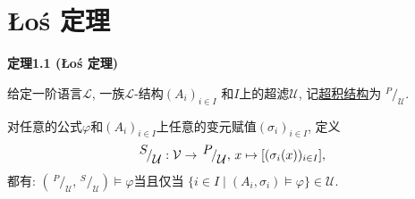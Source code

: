 \documentclass[UTF8]{ctexart}
\begin{document}
\setlength{\abovedisplayskip}{1pt}
\setlength{\belowdisplayskip}{1pt}

\section{Łoś 定理}

\hypertarget{sec:定理1.1}{}
\noindent\textbf{定理1.1 (Łoś 定理)}

给定一阶语言$\mathcal{L}$, 一族$\mathcal{L}$-结构$(A_i)_{i\in I}$
和$I$上的超滤$\mathcal{U}$, 记\href{01 超积结构#nameddest=sec:定义2.1}{超积结构}为
$^{\displaystyle P}\!/_{\displaystyle\mathcal{U}}$.

对任意的公式$\varphi$和$(A_i)_{i\in I}$上任意的变元赋值$(\sigma_i)_{i\in I}$, 定义
\[
    ^{\displaystyle S}\!/_{\displaystyle\mathcal{U}}:
    \mathcal{V}\to\,^{\displaystyle P}\!/_{\displaystyle\mathcal{U}},\,
    x\mapsto[(\sigma_i(x))_{i\in I}],\\[3pt]
\]
都有: $\left(\,^{\displaystyle P}\!/_{\displaystyle\mathcal{U}},\,
^{\displaystyle S}\!/_{\displaystyle\mathcal{U}}\right)\models\varphi$当且仅当
$\{i\in I\mid(A_i,\sigma_i)\models\varphi\}\in\mathcal{U}$.

\end{document}

